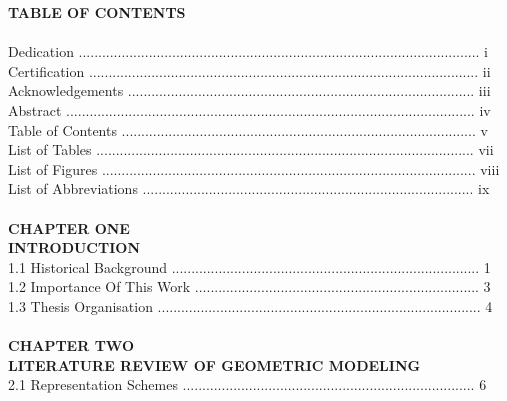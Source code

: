 \documentclass[11pt, oneside]{Thesis} %
\begin{document}
\Large \hspace*{125} \textbf{TABLE OF CONTENTS}\\
\large\\
Dedication ....................................................................................................... i\\
Certification .................................................................................................... ii\\
Acknowledgements ......................................................................................... iii\\
Abstract ......................................................................................................... iv\\
Table of Contents ........................................................................................... v\\
List of Tables ................................................................................................. vii\\
List of Figures ................................................................................................ viii\\
List of Abbreviations ..................................................................................... ix\\\\ 
\hspace*{155}			\textbf{CHAPTER ONE}\\ 
\hspace*{150}			\textbf{INTRODUCTION}\\
1.1 Historical Background ............................................................................... 1\\
1.2 Importance Of This Work ......................................................................... 3\\
1.3 Thesis Organisation ................................................................................... 4\\\\
\hspace*{155}			\textbf{CHAPTER TWO}\\
\hspace*{30}			\textbf{LITERATURE REVIEW OF GEOMETRIC MODELING}\\
2.1 Representation Schemes ........................................................................... 6\\
\end{document}
